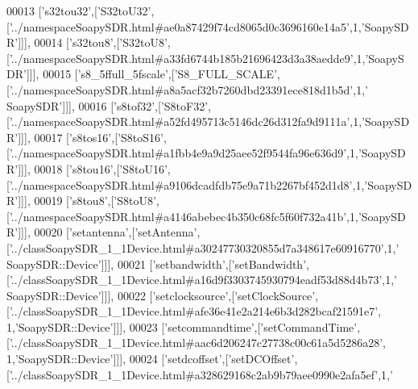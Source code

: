 \begin{DoxyCode}
00013   [\textcolor{stringliteral}{'s32tou32'},[\textcolor{stringliteral}{'S32toU32'},[\textcolor{stringliteral}{'../namespaceSoapySDR.html#ae0a87429f74cd8065d0c3696160e14a5'},1,\textcolor{stringliteral}{'SoapySDR'}]]],
00014   [\textcolor{stringliteral}{'s32tou8'},[\textcolor{stringliteral}{'S32toU8'},[\textcolor{stringliteral}{'../namespaceSoapySDR.html#a33fd6744b185b21696423d3a38aedde9'},1,\textcolor{stringliteral}{'SoapySDR'}]]],
00015   [\textcolor{stringliteral}{'s8\_5ffull\_5fscale'},[\textcolor{stringliteral}{'S8\_FULL\_SCALE'},[\textcolor{stringliteral}{'../namespaceSoapySDR.html#a8a5acf32b7260dbd23391ece818d1b5d'},1,\textcolor{stringliteral}{'
      SoapySDR'}]]],
00016   [\textcolor{stringliteral}{'s8tof32'},[\textcolor{stringliteral}{'S8toF32'},[\textcolor{stringliteral}{'../namespaceSoapySDR.html#a52fd495713c5146dc26d312fa9d9111a'},1,\textcolor{stringliteral}{'SoapySDR'}]]],
00017   [\textcolor{stringliteral}{'s8tos16'},[\textcolor{stringliteral}{'S8toS16'},[\textcolor{stringliteral}{'../namespaceSoapySDR.html#a1fbb4e9a9d25aee52f9544fa96e636d9'},1,\textcolor{stringliteral}{'SoapySDR'}]]],
00018   [\textcolor{stringliteral}{'s8tou16'},[\textcolor{stringliteral}{'S8toU16'},[\textcolor{stringliteral}{'../namespaceSoapySDR.html#a9106dcadfdb75e9a71b2267bf452d1d8'},1,\textcolor{stringliteral}{'SoapySDR'}]]],
00019   [\textcolor{stringliteral}{'s8tou8'},[\textcolor{stringliteral}{'S8toU8'},[\textcolor{stringliteral}{'../namespaceSoapySDR.html#a4146abebec4b350c68fc5f60f732a41b'},1,\textcolor{stringliteral}{'SoapySDR'}]]],
00020   [\textcolor{stringliteral}{'setantenna'},[\textcolor{stringliteral}{'setAntenna'},[\textcolor{stringliteral}{'../classSoapySDR\_1\_1Device.html#a30247730320855d7a348617e60916770'},1,\textcolor{stringliteral}{'
      SoapySDR::Device'}]]],
00021   [\textcolor{stringliteral}{'setbandwidth'},[\textcolor{stringliteral}{'setBandwidth'},[\textcolor{stringliteral}{'../classSoapySDR\_1\_1Device.html#a16d9f3303745930794eadf53d88d4b73'},1,\textcolor{stringliteral}{'
      SoapySDR::Device'}]]],
00022   [\textcolor{stringliteral}{'setclocksource'},[\textcolor{stringliteral}{'setClockSource'},[\textcolor{stringliteral}{'../classSoapySDR\_1\_1Device.html#afe36e41e2a214e6b3d282bcaf21591e7'},
      1,\textcolor{stringliteral}{'SoapySDR::Device'}]]],
00023   [\textcolor{stringliteral}{'setcommandtime'},[\textcolor{stringliteral}{'setCommandTime'},[\textcolor{stringliteral}{'../classSoapySDR\_1\_1Device.html#aac6d206247c27738c00c61a5d5286a28'},
      1,\textcolor{stringliteral}{'SoapySDR::Device'}]]],
00024   [\textcolor{stringliteral}{'setdcoffset'},[\textcolor{stringliteral}{'setDCOffset'},[\textcolor{stringliteral}{'../classSoapySDR\_1\_1Device.html#a328629168c2ab9b79aee0990e2afa5ef'},1,\textcolor{stringliteral}{'
}
\end{DoxyCode}
